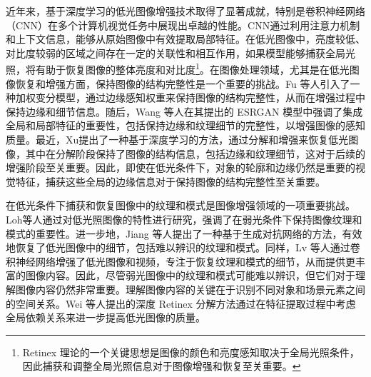 \documentclass[a4paper, 10pt]{article}
\begin{document}
		
		近年来，基于深度学习的低光图像增强技术取得了显著成就，特别是卷积神经网络（CNN）在多个计算机视觉任务中展现出卓越的性能。CNN通过利用注意力机制\cite{yang2021locally,zhang2020attention}和上下文信息，能够从原始图像中有效提取局部特征\cite{jain1991unsupervised, lowe2004distinctive, ojala2002multiresolution}。在低光图像中，亮度较低、对比度较弱的区域之间存在一定的关联性和相互作用，如果模型能够捕获全局光照，将有助于恢复图像的整体亮度和对比度\cite{chen2018learning, wang2013naturalness}\footnote{Retinex 理论的一个关键思想是图像的颜色和亮度感知取决于全局光照条件，因此捕获和调整全局光照信息对于图像增强和恢复至关重要。}。在图像处理领域，尤其是在低光图像恢复和增强方面，保持图像的结构完整性是一个重要的挑战。Fu 等人\cite{fu2016weighted}引入了一种加权变分模型，通过边缘感知权重来保持图像的结构完整性，从而在增强过程中保持边缘和细节信息。随后，Wang 等人\cite{wang2018esrgan}在其提出的 ESRGAN 模型中强调了集成全局和局部特征的重要性，包括保持边缘和纹理细节的完整性，以增强图像的感知质量。最近，Xu\cite{xu2020learning}提出了一种基于深度学习的方法，通过分解和增强来恢复低光图像，其中在分解阶段保持了图像的结构信息，包括边缘和纹理细节，这对于后续的增强阶段至关重要。因此，即使在低光条件下，对象的轮廓和边缘仍然是重要的视觉特征，捕获这些全局的边缘信息对于保持图像的结构完整性至关重要。
		
		在低光条件下捕获和恢复图像中的纹理和模式是图像增强领域的一项重要挑战。Loh等人\cite{loh2019getting}通过对低光照图像的特性进行研究，强调了在弱光条件下保持图像纹理和模式的重要性。进一步地，Jiang 等人\cite{jiang2021enlightengan}提出了一种基于生成对抗网络的方法，有效地恢复了低光图像中的细节，包括难以辨识的纹理和模式。同样，Lv 等人\cite{lv2018mbllen}通过卷积神经网络增强了低光图像和视频，专注于恢复纹理和模式的细节，从而提供更丰富的图像内容。因此，尽管弱光图像中的纹理和模式可能难以辨识，但它们对于理解图像内容仍然非常重要。理解图像内容的关键在于识别不同对象和场景元素之间的空间关系。Wei 等人\cite{wei2018deep}提出的深度 Retinex 分解方法通过在特征提取过程中考虑全局依赖关系来进一步提高低光图像的质量。
		
\end{document}
